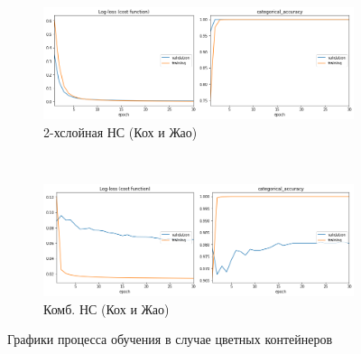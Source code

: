 \begin{figure}[p]
    \centering

    \begin{subfigure}{\textwidth}
        \includegraphics[width=\textwidth]{include/graphics/experimental_plots/color/french_koch}
                            \caption{2-хслойная НС (Кох и Жао)}
    \end{subfigure}
    ~
    \begin{subfigure}{\textwidth}
        \includegraphics[width=\textwidth]{include/graphics/experimental_plots/color/mixed_koch}
                                    \caption{Комб. НС (Кох и Жао)}
    \end{subfigure}

    \caption{Графики процесса обучения в случае цветных контейнеров}
    \label{fig:ColorPlotsKoch}
\end{figure}

